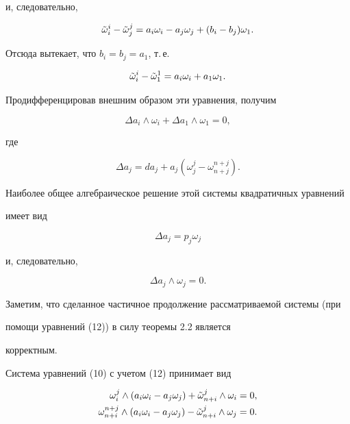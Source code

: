 и, следовательно, 


$$ 


\Tilde\omega^i_i-\Tilde\omega^j_j= 


a_i\omega_i-a_j\omega_j+(b_i-b_j)\omega_1. 


$$ 


Отсюда вытекает, что $b_i=b_j=a_1$, т.\,е. 


\begin{equation} 


\Tilde\omega^i_i-\Tilde\omega^1_1=a_i\omega_i+a_1\omega_1. 


\end{equation} 


Продифференцировав внешним образом эти уравнения, получим 


$$ 


\Delta a_i\wedge\omega_i+\Delta a_1\wedge\omega_1=0, 


$$ 


где 


$$ 


\Delta a_j=da_j+a_j(\omega^j_j-\omega^{n+j}_{n+j}). 


$$ 


Наиболее общее алгебраическое решение этой системы квадратичных уравнений 


имеет вид 


$$ 


\Delta a_j=p_j\omega_j 


$$ 


и, следовательно, 


\begin{equation} 


\Delta a_j\wedge\omega_j=0. 


\end{equation} 


 


Заметим, что сделанное частичное продолжение рассматриваемой системы (при 


помощи уравнений (12)) в силу теоремы 2.2 \cite{Mak1} является 


корректным. 


 


Система уравнений (10) с учетом (12) принимает вид 


\begin{equation} 


\begin{split} 


\omega^j_i\wedge(a_i\omega_i-a_j\omega_j) 


+\Tilde\omega^j_{n+i}\wedge\omega_i&=0,\\ 


\omega^{n+j}_{n+i}\wedge(a_i\omega_i-a_j\omega_j) 


-\Tilde\omega^j_{n+i}\wedge\omega_j&=0.


\end{split} 


\end{equation} 


